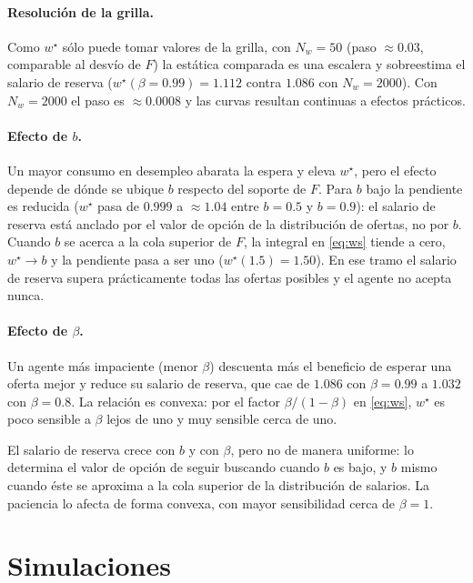 \documentclass[11pt,a4paper]{article}
\begin{document}
\paragraph{Resolución de la grilla.} Como $w^\star$ sólo puede tomar valores de la grilla, con $N_w=50$ (paso $\approx0.03$, comparable al desvío de $F$) la estática comparada es una escalera y sobreestima el salario de reserva ($w^\star(\beta=0.99)=1.112$ contra $1.086$ con $N_w=2000$). Con $N_w=2000$ el paso es $\approx0.0008$ y las curvas resultan continuas a efectos prácticos.

\paragraph{Efecto de $b$.} Un mayor consumo en desempleo abarata la espera y eleva $w^\star$, pero el efecto depende de dónde se ubique $b$ respecto del soporte de $F$. Para $b$ bajo la pendiente es reducida ($w^\star$ pasa de $0.999$ a $\approx1.04$ entre $b=0.5$ y $b=0.9$): el salario de reserva está anclado por el valor de opción de la distribución de ofertas, no por $b$. Cuando $b$ se acerca a la cola superior de $F$, la integral en \eqref{eq:ws} tiende a cero, $w^\star\to b$ y la pendiente pasa a ser uno ($w^\star(1.5)=1.50$). En ese tramo el salario de reserva supera prácticamente todas las ofertas posibles y el agente no acepta nunca.

\paragraph{Efecto de $\beta$.} Un agente más impaciente (menor $\beta$) descuenta más el beneficio de esperar una oferta mejor y reduce su salario de reserva, que cae de $1.086$ con $\beta=0.99$ a $1.032$ con $\beta=0.8$. La relación es convexa: por el factor $\beta/(1-\beta)$ en \eqref{eq:ws}, $w^\star$ es poco sensible a $\beta$ lejos de uno y muy sensible cerca de uno.

\begin{resultado}
El salario de reserva crece con $b$ y con $\beta$, pero no de manera uniforme: lo determina el valor de opción de seguir buscando cuando $b$ es bajo, y $b$ mismo cuando éste se aproxima a la cola superior de la distribución de salarios. La paciencia lo afecta de forma convexa, con mayor sensibilidad cerca de $\beta=1$.
\end{resultado}

\section{Simulaciones}
\end{document}
